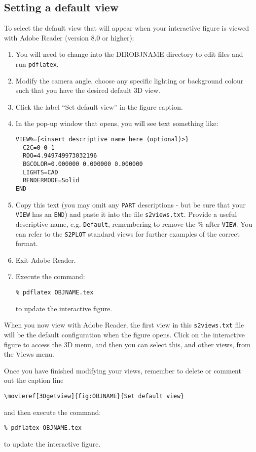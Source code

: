 \documentclass{article}
\begin{document}
\subsection*{Setting a default view}
To select the default view that will appear when your interactive figure is viewed
with Adobe Reader (version 8.0 or higher):
\begin{enumerate}
\item You will need to change into the DIR\-OBJNAME directory to edit files and
run {\tt pdflatex}.
\item Modify the camera angle, choose any specific lighting or background colour 
such that you have the desired default 3D view. 
\item Click the label ``Set default view'' in the figure caption.
\item In the pop-up window that opens, you will see text something like:\\

\begin{verbatim}
VIEW%={<insert descriptive name here (optional)>}
  C2C=0 0 1
  ROO=4.949749973032196
  BGCOLOR=0.000000 0.000000 0.000000
  LIGHTS=CAD
  RENDERMODE=Solid
END
\end{verbatim}

\item Copy this text (you may omit any {\tt PART} descriptions - but be sure that 
your {\tt VIEW} has an {\tt END}) and paste it into the file {\tt s2views.txt}.  
Provide a useful descriptive name, e.g. {\tt Default}, remembering to remove the \% 
after {\tt VIEW}.  You can refer to the {\tt S2PLOT} standard views for further
examples of the correct format. 

\item Exit Adobe Reader.

\item Execute the command:
\begin{verbatim}
% pdflatex OBJNAME.tex
\end{verbatim}
to update the interactive figure.
\end{enumerate}

When you now view with Adobe Reader, the first view in this {\tt s2views.txt} file
will be the default configuration when the figure opens. Click on the
interactive figure to access the 3D menu, and then you can select this, and
other views, from the Views menu.

Once you have finished modifying your views, remember to delete or comment out
the caption line 
\begin{verbatim}
\movieref[3Dgetview]{fig:OBJNAME}{Set default view}
\end{verbatim}
and then execute the command:
\begin{verbatim}
% pdflatex OBJNAME.tex
\end{verbatim}
to update the interactive figure.
 
\end{document}
